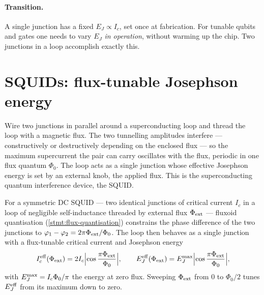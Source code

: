 \paragraph{Transition.}
A single junction has a fixed $E_J\propto I_c$, set once at
fabrication. For tunable qubits and gates one needs to vary $E_J$
\emph{in operation}, without warming up the chip. Two junctions in a
loop accomplish exactly this.

\section{SQUIDs: flux-tunable Josephson energy}
\label{sec:squid}

\begin{phenomenon}
Wire two junctions in parallel around a superconducting loop and thread
the loop with a magnetic flux. The two tunnelling amplitudes interfere
--- constructively or destructively depending on the enclosed flux ---
so the maximum supercurrent the pair can carry oscillates with the
flux, periodic in one flux quantum $\Phi_0$. The loop acts as a single
junction whose effective Josephson energy is set by an external knob,
the applied flux. This is the superconducting quantum interference
device, the SQUID.
\end{phenomenon}

\begin{statement}
\label{stmt:squid}
For a symmetric DC SQUID --- two identical junctions of critical
current $I_c$ in a loop of negligible self-inductance threaded by
external flux $\Phi_{\rm ext}$ --- fluxoid quantisation
(\cref{stmt:flux-quantisation}) constrains the phase difference of the
two junctions to $\varphi_1-\varphi_2=2\pi\Phi_{\rm ext}/\Phi_0$. The
loop then behaves as a single junction with a flux-tunable critical
current and Josephson energy
\begin{equation}
\label{eq:squid-tuning}
I_c^{\rm eff}(\Phi_{\rm ext}) = 2I_c\Bigl|\cos\frac{\pi\Phi_{\rm ext}}{\Phi_0}\Bigr|,
\qquad
E_J^{\rm eff}(\Phi_{\rm ext}) = E_J^{\rm max}\Bigl|\cos\frac{\pi\Phi_{\rm ext}}{\Phi_0}\Bigr|,
\end{equation}
with $E_J^{\rm max}=I_c\Phi_0/\pi$ the energy at zero flux. Sweeping
$\Phi_{\rm ext}$ from $0$ to $\Phi_0/2$ tunes $E_J^{\rm eff}$ from its
maximum down to zero.
\end{statement}


